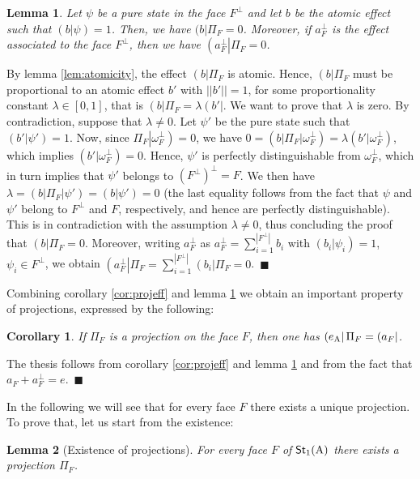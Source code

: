 \documentclass[12pt,aps,pra,showpacs,groupedaddress]{revtex4-1}
\newtheorem{lemma}{Lemma} \newtheorem{proposition}{Proposition}
\newtheorem{corollary}{Corollary} \newtheorem{theorem}{Theorem}
\def\Proof{\medskip\par\noindent{\bf Proof. }}
\def\qed{$\,\blacksquare$\par}
\def\Stset{{\mathsf{St}}}
\def\K#1{\left|#1\right)}  \def\B#1{\left(#1\right|}
\def\SC#1#2{\left(#1\right|\left.\!#2\right)}  \def\Tr{{\rm Tr}}
\begin{document}
\begin{lemma}\label{lem:zeroeff}
Let $\psi$ be a pure state in the face $F^\perp$ and let $b$ be the atomic effect such
  that $\SC {b}\psi =1$. Then, we have $(b|\Pi_F=0$.  Moreover, if $a^\perp_F$ is the effect associated to the face $F^\perp$, then we have $\B  {a_F^\perp}  \Pi_F = 0$.
\end{lemma}
\Proof   By lemma \ref{lem:atomicity}, the effect $\B {b}\Pi_F $ is atomic.  Hence, $\B b \Pi_F$ must be proportional to an atomic effect $b'$ with $|\!|  b'|\!| = 1$, for some proportionality constant $\lambda \in [0,1]$, that is $\B b \Pi_F  =  \lambda \B{b'}$.  We want to prove that $\lambda$ is zero. By contradiction, suppose  that $\lambda \not = 0$.  Let $\psi'$ be the pure state such that $\SC {b'}{\psi'} =1$.  Now, since
$\Pi_F \K{\omega_F^\perp}=0$, we have $0= ( b| \Pi_F |\omega^\perp_F)=\lambda  (b' |\omega_F^\perp)$, which implies $(b'|\omega_F^\perp) =0$.   Hence, $\psi'$ is perfectly distinguishable from $\omega_F^\perp$, which in turn implies that $\psi'$  belongs to $\left(F^\perp\right)^\perp =F$. We then have $\lambda = \B b \Pi_F  \K{\psi'} =  \SC b {\psi'} = 0$ (the last equality follows from the fact that $\psi$ and $\psi'$ belong to $F^\perp$ and $F$, respectively, and hence are perfectly distinguishable).  This is in contradiction with the assumption $\lambda \not =0$, thus concluding the proof that  $\B b \Pi_F  =0$.    Moreover, writing  $a_F^\perp$ as  $a_F^\perp  = \sum_{i=1}^{|F^\perp|}  b_i$ with $\SC{b_i}{\psi_i} = 1$, $\psi_i \in F^\perp$, we obtain $\B {a_F^\perp}  \Pi_F  =\sum_{i=1}^{|F^\perp| }   \B {b_i}  \Pi_F = 0$. \qed  



Combining corollary \ref{cor:projeff}  and lemma \ref{lem:zeroeff} we obtain an important property of projections, expressed by the following:
\begin{corollary}\label{cor:effettodipi} 
If $\Pi_F$ is a projection on the face $F$, then one has $\B {e_\rA} \Pi_F  = \B {a_F}$. 
\end{corollary}
\Proof The thesis follows from  corollary \ref{cor:projeff}  and lemma \ref{lem:zeroeff}  and from the fact that $a_F + a_F^\perp = e$. \qed 






In the following we will see that for every face $F$ there exists a unique projection.  To prove
that, let us start from the existence:
\begin{lemma}[Existence of projections]\label{lem:existence}
  For every face $F$ of $\Stset_1(\rA)$ there exists a projection
  $\Pi_F$.  
\end{lemma}
\end{document}
